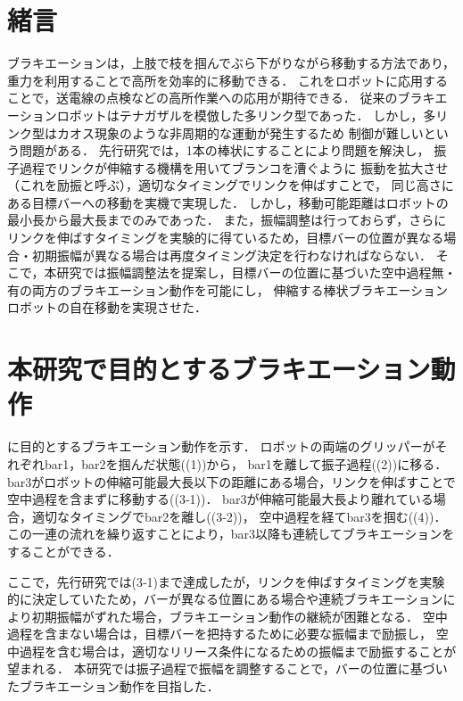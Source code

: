 \begin{small}
\section{緒言}
\vspace{-3mm}
ブラキエーションは，上肢で枝を掴んでぶら下がりながら移動する方法であり，
重力を利用することで高所を効率的に移動できる．
これをロボットに応用することで\cite{福田敏男1990ブラキエーション形移動ロボットの研究}，送電線の点検などの高所作業への応用が期待できる．
従来のブラキエーションロボットはテナガザルを模倣した多リンク型であった．
しかし，多リンク型はカオス現象のような非周期的な運動が発生するため
制御が難しいという問題がある\cite{鈴木三男2000二重振り子におけるカオス的振舞}．
先行研究では，1本の棒状にすることにより問題を解決し，
振子過程でリンクが伸縮する機構を用いてブランコを漕ぐように
振動を拡大させ（これを励振と呼ぶ），適切なタイミングでリンクを伸ばすことで，
同じ高さにある目標バーへの移動を実機で実現した\cite{Hijiri:Robomech2024}．
しかし，移動可能距離はロボットの最小長から最大長までのみであった．
また，振幅調整は行っておらず，さらにリンクを伸ばすタイミングを実験的に得ているため，目標バーの位置が異なる場合・初期振幅が異なる場合は再度タイミング決定を行わなければならない．
そこで，本研究では振幅調整法を提案し，目標バーの位置に基づいた空中過程無・有の両方のブラキエーション動作を可能にし，
伸縮する棒状ブラキエーションロボットの自在移動を実現させた．
\section{本研究で目的とするブラキエーション動作}
\vspace{-2mm}
に目的とするブラキエーション動作を示す．
ロボットの両端のグリッパーがそれぞれbar1，bar2を掴んだ状態((1))から，
bar1を離して振子過程((2))に移る．
bar3がロボットの伸縮可能最大長以下の距離にある場合，リンクを伸ばすことで空中過程を含まずに移動する((3‐1))．
bar3が伸縮可能最大長より離れている場合，適切なタイミングでbar2を離し((3‐2))，
空中過程を経てbar3を掴む((4))．この一連の流れを繰り返すことにより，bar3以降も連続してブラキエーションをすることができる．

ここで，先行研究では(3‐1)まで達成したが，リンクを伸ばすタイミングを実験的に決定していたため，バーが異なる位置にある場合や連続ブラキエーションにより初期振幅がずれた場合，ブラキエーション動作の継続が困難となる．
空中過程を含まない場合は，目標バーを把持するために必要な振幅まで励振し，
空中過程を含む場合は，適切なリリース条件になるための振幅まで励振することが望まれる．
本研究では振子過程で振幅を調整することで，バーの位置に基づいたブラキエーション動作を目指した．


\end{small}
